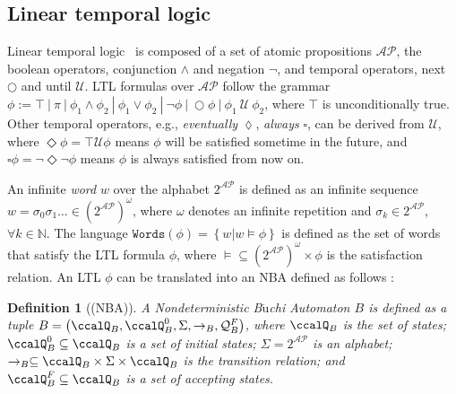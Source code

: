 \documentclass[Afour,sageh,times]{sagej}
\newtheorem{defn}[thm]{Definition}
\begin{document}
\subsection{Linear temporal logic}\label{sec:ltl}
Linear temporal logic~\cite{baier2008principles} is composed of a set of atomic propositions $\mathcal{AP}$, the boolean operators, conjunction $\wedge$ and negation $\neg$, and temporal operators, next $\bigcirc$ and until $\mathcal{U}$. LTL formulas over $\mathcal{AP}$ follow the grammar $\phi:=\top~|~\pi~|~\phi_1\wedge\phi_2~|~\phi_1\vee\phi_2~|~\neg\phi~|~\bigcirc\phi~|~\phi_1~\mathcal{U}~\phi_2$, where $\top$ is unconditionally true.   Other temporal operators, e.g., \textit{eventually} $\lozenge$, \textit{always} $\square$, can be derived from $\mathcal{U}$, where $\Diamond \phi = \top \mathcal{U} \phi$ means $\phi$ will be satisfied sometime in the future, and $\square \phi = \neg \Diamond \neg \phi$ means $\phi$ is always satisfied from now on. %

An infinite \textit{word} $w$ over the alphabet $2^{\mathcal{AP}}$ is defined as an infinite sequence  $w=\sigma_0\sigma_1\ldots\in (2^{\mathcal{AP}})^{\omega}$, where $\omega$ denotes an infinite repetition and $\sigma_k\in2^{\mathcal{AP}}$, $\forall k\in\mathbb{N}$. The language $\texttt{Words}(\phi)=\left\{w|w\models\phi\right\}$ is defined as the set of words that satisfy the LTL formula $\phi$, where $\models\subseteq (2^{\mathcal{AP}})^{\omega}\times\phi$ is the satisfaction relation. An LTL $\phi$ can be translated into an NBA  defined as follows \citep{vardi1986automata}:
\begin{defn}[(NBA)]\label{def:nba}
  A \textit{Nondeterministic B$\ddot{\text{u}}$chi Automaton} $B$ is defined as a tuple $B=\left(\ccalQ_{B}, \ccalQ_{B}^0,\Sigma,\rightarrow_B,\mathcal{Q}_B^F\right)$, where $\ccalQ_{B}$ is the set of states; $\ccalQ_{B}^0\subseteq\ccalQ_{B}$ is a set of initial states; $\Sigma=2^{\mathcal{AP}}$ is an alphabet;  $\rightarrow_{B}\subseteq\ccalQ_{B}\times \Sigma\times\ccalQ_{B}$ is the transition relation;
and $\ccalQ_B^F\subseteq\ccalQ_{B}$ is a set of accepting states.
\end{defn}
\end{document}
